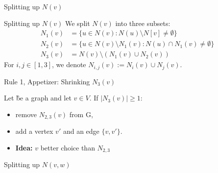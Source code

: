 \begin{frame}[c]{Splitting up $N(v)$}
    \begin{figure}[!ht]
    \end{figure}
\end{frame}
\begin{frame}[c]{Splitting up $N(v)$}
 We split $N(v)$ into three subsets:
    \begin{align}
        N_1(v) & = \{u \in N(v) : N(u) \setminus N[v] \neq \emptyset \}              \\
        N_2(v) & = \{u \in N(v)\setminus N_1(v) : N(u) \cap N_1(v) \neq \emptyset \} \\
        N_3(v) & = N(v) \setminus (N_1(v) \cup N_2(v))
    \end{align}
    For $i,j \in [1,3]$, we denote $N_{i,j} (v) := N_i(v) \cup N_j(v)$. 
\end{frame}


\begin{frame}[c]{Rule 1, Appetizer: Shrinking $N_3(v)$}

    \begin{tcolorbox}[colback=TUMBlueLighter,title=]
        Let \G be a graph and let $v \in V$. If $|N_3(v)| \geq 1$:
        \begin{itemize}
            \item remove $N_{2,3}(v)$ from G,
            \item add a vertex $v'$ and an edge $\{v, v'\}$.
        \end{itemize}
    \end{tcolorbox}

    \begin{figure}[!ht]
    \end{figure}
    \begin{itemize}
        \item \textbf{Idea: } $v$ better choice than $N_{2,3}$
    \end{itemize}
\end{frame}

\begin{frame}[c]{Splitting up $N(v,w)$}

    \begin{figure}[!ht]
    \end{figure}
\end{frame}

